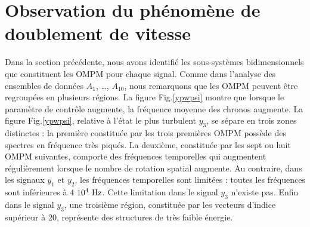 \documentclass{book}
\begin{document}
\section{Observation du ph\'enom\`ene de doublement de
vitesse}
Dans la section pr\'ec\'edente, nous avons identifi\'e les
sous-syst\`emes bidimensionnels que constituent les OMPM pour chaque
signal.  Comme dans l'analyse des ensembles de donn\'ees
$A_1$, \dots, $A_{10}$, nous remarquons que les OMPM  peuvent \^etre
regroup\'ees en plusieurs r\'egions. La figure Fig.\ref{ypwpsi} montre
que lorsque le param\`etre de contr\^ole augmente, la fr\'equence
moyenne des chronos augmente. La figure Fig.\ref{ypwpsi}, relative \`a
l'\'etat le plus turbulent $y_3$, se
s\'epare en trois zones distinctes : la premi\`ere constitu\'ee par les
trois premi\`eres OMPM poss\`ede des spectres en fr\'equence tr\`es
piqu\'es. La deuxi\`eme, constitu\'ee par les sept ou huit OMPM
suivantes, comporte des fr\'equences temporelles qui augmentent
r\'eguli\`erement lorsque le nombre de rotation spatial augmente. Au
contraire, dans les signaux $y_1$ et $y_2$, les fr\'equences
temporelles sont limit\'ees : toutes les fr\'equences sont
inf\'erieures \`a $4\ 10^{4}\ {\rm Hz}$. Cette limitation dans le
signal $y_3$ n'existe pas. Enfin dans le signal $y_3$, une
troisi\`eme r\'egion, constitu\'ee par les vecteurs d'indice
sup\'erieur \`a $20$, repr\'esente des structures de tr\`es faible
\'energie. 
\end{document}
